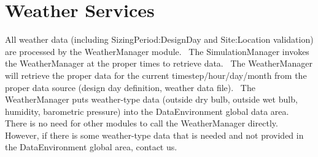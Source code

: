 \section{Weather Services}\label{weather-services}

All weather data (including SizingPeriod:DesignDay and Site:Location validation) are processed by the WeatherManager module.~ The SimulationManager invokes the WeatherManager at the proper times to retrieve data.~ The WeatherManager will retrieve the proper data for the current timestep/hour/day/month from the proper data source (design day definition, weather data file).~ The WeatherManager puts weather-type data (outside dry bulb, outside wet bulb, humidity, barometric pressure) into the DataEnvironment global data area.~ There is no need for other modules to call the WeatherManager directly.~ However, if there is some weather-type data that is needed and not provided in the DataEnvironment global area, contact us.
